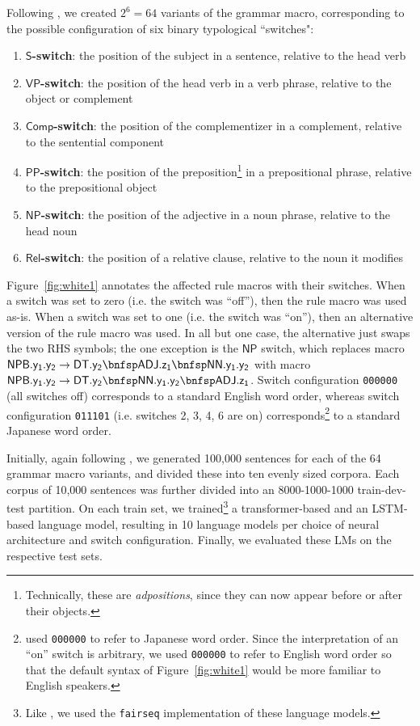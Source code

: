 \documentclass[11pt,a4paper]{article}
\renewcommand{\bnfpn}[1]{\mathsf{#1}}
\renewcommand{\bnfpo}{\rightarrow}
\begin{document}
Following \citet{white-cotterell-2021-examining}, we created $2^6=64$ variants of the grammar macro, corresponding to the possible configuration of six binary typological ``switches":
\begin{enumerate}
	\item \textbf{$\bnfpn{S}$-switch}: the position of the subject in a sentence, relative to the head verb 
	\item \textbf{$\bnfpn{VP}$-switch}: the position of the head verb in a verb phrase, relative to the object or complement
	\item \textbf{$\bnfpn{Comp}$-switch}: the position of the complementizer in a complement, relative to the sentential component
	\item \textbf{$\bnfpn{PP}$-switch}: the position of the preposition\footnote{Technically, these are \emph{adpositions}, since they can now appear before or after their objects.} in a prepositional phrase, relative to the prepositional object
	\item \textbf{$\bnfpn{NP}$-switch}: the position of the adjective in a noun phrase, relative to the head noun
	\item \textbf{$\bnfpn{Rel}$-switch}: the position of a relative clause, relative to the noun it modifies
\end{enumerate}
\noindent Figure~\ref{fig:white1} annotates the affected rule macros with their switches. When a switch was set to zero (i.e. the switch was ``off''), then the rule macro was used as-is. When a switch was set to one (i.e. the switch was ``on''), then an alternative version of the rule macro was used. In all but one case, the alternative just swaps the two RHS symbols; the one exception is the $\bnfpn{NP}$ switch, which replaces macro $\bnfpn{NPB.y_1.y_2} \bnfpo \bnfpn{DT.y_2} \bnfsp \bnfpn{ADJ.z_1} \bnfsp \bnfpn{NN.y_1.y_2}$ with macro $\bnfpn{NPB.y_1.y_2} \bnfpo \bnfpn{DT.y_2}  \bnfsp \bnfpn{NN.y_1.y_2} \bnfsp \bnfpn{ADJ.z_1}$. Switch configuration \texttt{000000} (all switches off) corresponds to a standard English word order, whereas switch configuration \texttt{011101} (i.e. switches 2, 3, 4, 6 are on) corresponds\footnote{\citet{white-cotterell-2021-examining} used \texttt{000000} to refer to Japanese word order. Since the interpretation of an ``on'' switch is arbitrary, we used \texttt{000000} to refer to English word order so that the default syntax of Figure~\ref{fig:white1} would be more familiar to English speakers.} to a standard Japanese word order.

Initially, again following \citet{white-cotterell-2021-examining}, we generated 100,000 sentences for each of the 64 grammar macro variants, and divided these into ten evenly sized corpora. Each corpus of 10,000 sentences was further divided into an 8000-1000-1000 train-dev-test partition. On each train set, we trained\footnote{Like \citet{white-cotterell-2021-examining}, we used the \texttt{fairseq} implementation \cite{ott-etal-2019-fairseq} of these language models.} a transformer-based and an LSTM-based language model, resulting in 10 language models per choice of neural architecture and switch configuration. Finally, we evaluated these LMs on the respective test sets. 
\end{document}
